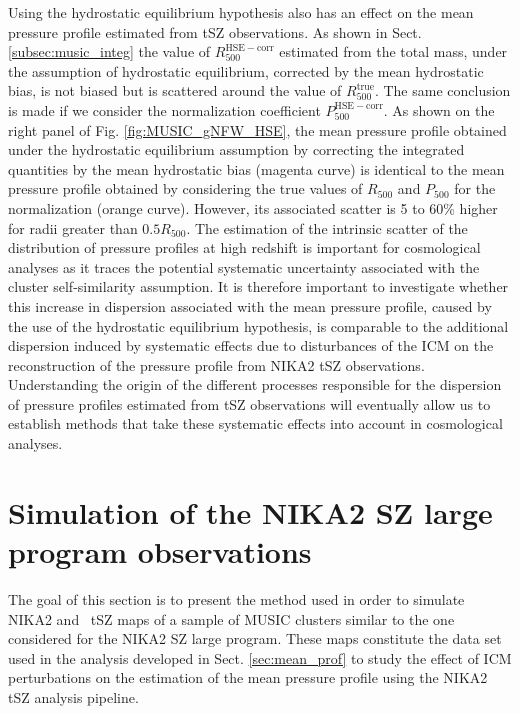 \documentclass[twocolumn,traditabstract]{aa}
\begin{document}
Using the hydrostatic equilibrium hypothesis also has an effect on the mean pressure profile estimated from tSZ observations. As shown in Sect. \ref{subsec:music_integ} the value of $R_{500}^{\mathrm{HSE-corr}}$ estimated from the total mass, under the assumption of hydrostatic equilibrium, corrected by the mean hydrostatic bias, is not biased but is scattered around the value of $R_{500}^{\mathrm{true}}$. The same conclusion is made if we consider the normalization coefficient $P_{500}^{\mathrm{HSE-corr}}$. As shown on the right panel of Fig. \ref{fig:MUSIC_gNFW_HSE}, the mean pressure profile obtained under the hydrostatic equilibrium assumption by correcting the integrated quantities by the mean hydrostatic bias (magenta curve) is identical to the mean pressure profile obtained by considering the true values of $R_{500}$ and $P_{500}$ for the normalization (orange curve). However, its associated scatter is 5 to 60\% higher for radii greater than $0.5R_{500}$. The estimation of the intrinsic scatter of the distribution of pressure profiles at high redshift is important for cosmological analyses as it traces the potential systematic uncertainty associated with the cluster self-similarity assumption. It is therefore important to investigate whether this increase in dispersion associated with the mean pressure profile, caused by the use of the hydrostatic equilibrium hypothesis, is comparable to the additional dispersion induced by systematic effects due to disturbances of the ICM on the reconstruction of the pressure profile from NIKA2 tSZ observations. Understanding the origin of the different processes responsible for the dispersion of pressure profiles estimated from tSZ observations will eventually allow us to establish methods that take these systematic effects into account in cosmological analyses.

\section{Simulation of the NIKA2 SZ large program observations}\label{sec:nika2_simu}

The goal of this section is to present the method used in order to simulate NIKA2 and \planck\ tSZ maps of a sample of MUSIC clusters similar to the one considered for the NIKA2 SZ large program. These maps constitute the data set used in the analysis developed in Sect. \ref{sec:mean_prof} to study the effect of ICM perturbations on the estimation of the mean pressure profile using the NIKA2 tSZ analysis pipeline.
\end{document}
